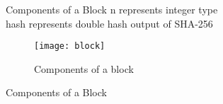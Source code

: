\documentclass{beamer}
\begin{document}
\begin{frame}{Components of a Block}
n represents integer type \\
hash represents double hash output of SHA-256
\begin{figure}[H]\centering 
\texttt{[image: block]}
\caption{Components of a block}
\end{figure}
    
\end{frame}
\begin{frame}{Components of a Block}
    
\end{frame}



\end{document}
